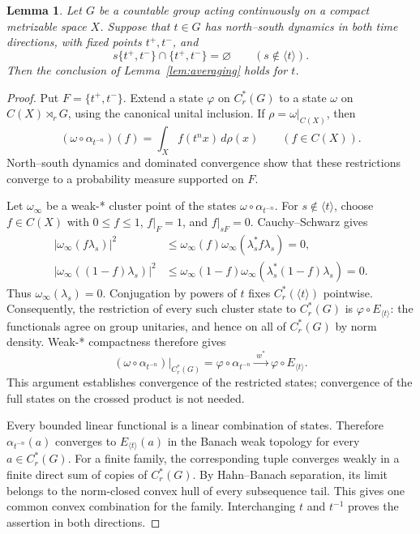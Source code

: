 \documentclass[11pt,letterpaper]{amsart}
\numberwithin{equation}{section}
\newtheorem{lemma}[theorem]{Lemma}
\theoremstyle{definition}
\theoremstyle{remark}
\newcommand{\Cr}{C_r^*}
\begin{document}
\begin{lemma}\label{lem:boundary}
Let $G$ be a countable group acting continuously on a compact
metrizable space $X$. Suppose that $t\in G$ has north--south dynamics
in both time directions, with fixed points $t^+,t^-$, and
\[
 s\{t^+,t^-\}\cap\{t^+,t^-\}=\varnothing
 \qquad(s\notin\langle t\rangle).
\]
Then the conclusion of Lemma~\ref{lem:averaging} holds for $t$.
\end{lemma}
\begin{proof}
Put $F=\{t^+,t^-\}$.
Extend a state $\varphi$ on $\Cr(G)$ to a state $\omega$ on
$C(X)\rtimes_rG$, using the canonical unital inclusion.
If $\rho=\omega|_{C(X)}$, then
\[
 (\omega\circ\alpha_{t^{-n}})(f)
 =\int_X f(t^nx)\,d\rho(x)\qquad(f\in C(X)).
\]
North--south dynamics and dominated convergence show that these
restrictions converge to a probability measure supported on $F$.

Let $\omega_\infty$ be a weak-* cluster point of the states
$\omega\circ\alpha_{t^{-n}}$.
For $s\notin\langle t\rangle$, choose $f\in C(X)$ with
$0\le f\le1$, $f|_F=1$, and $f|_{sF}=0$.
Cauchy--Schwarz gives
\begin{align*}
 |\omega_\infty(f\lambda_s)|^2
 &\le\omega_\infty(f)
       \omega_\infty(\lambda_s^*f\lambda_s)=0,\\
 |\omega_\infty((1-f)\lambda_s)|^2
 &\le\omega_\infty(1-f)
       \omega_\infty(\lambda_s^*(1-f)\lambda_s)=0.
\end{align*}
Thus $\omega_\infty(\lambda_s)=0$.
Conjugation by powers of $t$ fixes $\Cr(\langle t\rangle)$ pointwise.
Consequently, the restriction of every such cluster state to $\Cr(G)$
is $\varphi\circ E_{\langle t\rangle}$: the functionals agree on
group unitaries, and hence on all of $\Cr(G)$ by norm density.
Weak-* compactness therefore gives
\[
 (\omega\circ\alpha_{t^{-n}})|_{\Cr(G)}
 =\varphi\circ\alpha_{t^{-n}}
 \xrightarrow{\;w^*\;}\varphi\circ E_{\langle t\rangle}.
\]
This argument establishes convergence of the restricted states;
convergence of the full states on the crossed product is not needed.

Every bounded linear functional is a linear combination of states.
Therefore $\alpha_{t^{-n}}(a)$ converges to
$E_{\langle t\rangle}(a)$ in the Banach weak topology for every
$a\in\Cr(G)$.
For a finite family, the corresponding tuple converges weakly in a
finite direct sum of copies of $\Cr(G)$.
By Hahn--Banach separation, its limit belongs to the norm-closed convex
hull of every subsequence tail. This gives one common convex
combination for the family.
Interchanging $t$ and $t^{-1}$ proves the assertion in both directions.
\end{proof}
\end{document}
